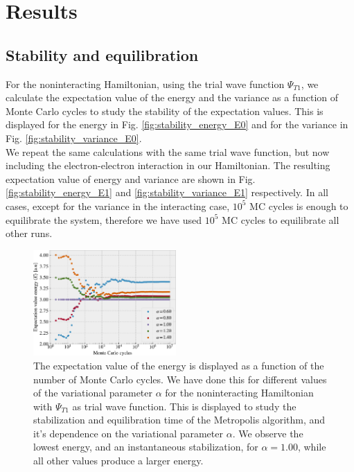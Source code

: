 \documentclass[%
 reprint,
nofootinbib,
aps,
]{revtex4-1}
\begin{document}
\section{Results}

\subsection{Stability and equilibration}
For the noninteracting Hamiltonian, using the trial wave function $\Psi_{T1}$, we calculate the expectation value of the energy and the variance as a function of Monte Carlo cycles to study the stability of the expectation values. This is displayed for the energy in Fig. \vref{fig:stability_energy_E0} and for the variance in Fig. \vref{fig:stability_variance_E0}.\\
We repeat the same calculations with the same trial wave function, but now including the electron-electron interaction in our Hamiltonian. The resulting expectation value of energy and variance are shown in Fig. \ref{fig:stability_energy_E1} and \vref{fig:stability_variance_E1} respectively. In all cases, except for the variance in the interacting case, $10^5$ MC cycles is enough to equilibrate the system, therefore we have used $10^5$ MC cycles to equilibrate all other runs.

\begin{figure}
  \centering
  \includegraphics[width=0.485\textwidth]{../figures/stability_energy_E0.pdf}
  \caption{The expectation value of the energy is displayed as a function of the number of Monte Carlo cycles. We have done this for different values of the variational parameter $\alpha$ for the noninteracting Hamiltonian with $\Psi_{T1}$ as trial wave function. This is displayed to study the stabilization and equilibration time of the Metropolis algorithm, and it's dependence on the variational parameter $\alpha$. We observe the lowest energy, and an instantaneous stabilization, for $\alpha=1.00$, while all other values produce a larger energy.}
  \label{fig:stability_energy_E0}
\end{figure}
\end{document}
